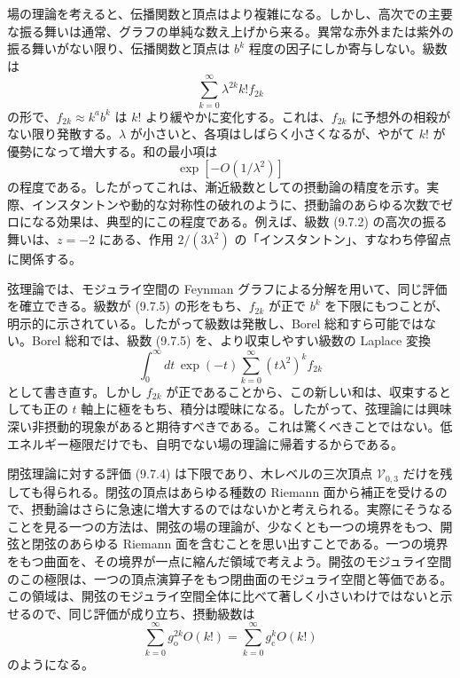 場の理論を考えると、伝播関数と頂点はより複雑になる。しかし、高次での主要な振る舞いは通常、グラフの単純な数え上げから来る。異常な赤外または紫外の振る舞いがない限り、伝播関数と頂点は $b^k$ 程度の因子にしか寄与しない。級数は
\begin{equation}
\sum_{k=0}^{\infty}\lambda^{2k}k!f_{2k}
\tag{9.7.5}\label{eq:9.7.5}
\end{equation}
の形で、$f_{2k}\approx k^ab^k$ は $k!$ より緩やかに変化する。これは、$f_{2k}$ に予想外の相殺がない限り発散する。$\lambda$ が小さいと、各項はしばらく小さくなるが、やがて $k!$ が優勢になって増大する。和の最小項は
\begin{equation}
\exp[-O(1/\lambda^2)]
\tag{9.7.6}\label{eq:9.7.6}
\end{equation}
の程度である。したがってこれは、漸近級数としての摂動論の精度を示す。実際、インスタントンや動的な対称性の破れのように、摂動論のあらゆる次数でゼロになる効果は、典型的にこの程度である。例えば、級数 (9.7.2) の高次の振る舞いは、$z=-2$ にある、作用 $2/(3\lambda^2)$ の「インスタントン」、すなわち停留点に関係する。

弦理論では、モジュライ空間の Feynman グラフによる分解を用いて、同じ評価を確立できる。級数が (9.7.5) の形をもち、$f_{2k}$ が正で $b^k$ を下限にもつことが、明示的に示されている。したがって級数は発散し、Borel 総和すら可能ではない。Borel 総和では、級数 (9.7.5) を、より収束しやすい級数の Laplace 変換
\begin{equation}
\int_0^\infty dt\,\exp(-t)
\sum_{k=0}^{\infty}(t\lambda^2)^kf_{2k}
\tag{9.7.7}\label{eq:9.7.7}
\end{equation}
として書き直す。しかし $f_{2k}$ が正であることから、この新しい和は、収束するとしても正の $t$ 軸上に極をもち、積分は曖昧になる。したがって、弦理論には興味深い非摂動的現象があると期待すべきである。これは驚くべきことではない。低エネルギー極限だけでも、自明でない場の理論に帰着するからである。

閉弦理論に対する評価 (9.7.4) は下限であり、木レベルの三次頂点 $\mathcal V_{0,3}$ だけを残しても得られる。閉弦の頂点はあらゆる種数の Riemann 面から補正を受けるので、摂動論はさらに急速に増大するのではないかと考えられる。実際にそうなることを見る一つの方法は、開弦の場の理論が、少なくとも一つの境界をもつ、開弦と閉弦のあらゆる Riemann 面を含むことを思い出すことである。一つの境界をもつ曲面を、その境界が一点に縮んだ領域で考えよう。開弦のモジュライ空間のこの極限は、一つの頂点演算子をもつ閉曲面のモジュライ空間と等価である。この領域は、開弦のモジュライ空間全体に比べて著しく小さいわけではないと示せるので、同じ評価が成り立ち、摂動級数は
\begin{equation}
\sum_{k=0}^{\infty}g_{\mathrm o}^{2k}O(k!)
=\sum_{k=0}^{\infty}g_{\mathrm c}^{k}O(k!)
\tag{9.7.8}\label{eq:9.7.8}
\end{equation}
のようになる。

